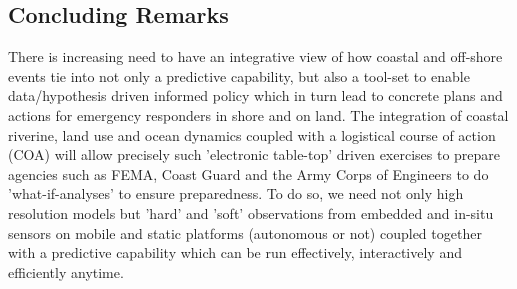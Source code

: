\subsection*{Concluding Remarks}

There is increasing need to have an integrative view of how coastal and
off-shore events tie into not only a predictive capability, but also a
tool-set to enable data/hypothesis driven informed policy which in turn
lead to concrete plans and actions for emergency responders in shore and
on land. The integration of coastal riverine, land use and ocean
dynamics coupled with a logistical course of action (COA) will allow
precisely such 'electronic table-top' driven exercises to prepare
agencies such as FEMA, Coast Guard and the Army Corps of Engineers to do
'what-if-analyses' to ensure preparedness. To do so, we need not only
high resolution models but 'hard' and 'soft' observations from embedded
and in-situ sensors on mobile and static platforms (autonomous or not)
coupled together with a predictive capability which can be run
effectively, interactively and efficiently anytime.
